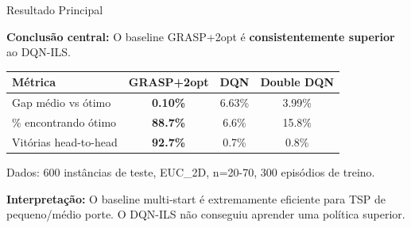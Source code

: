 \documentclass[11pt, xcolor=dvipsnames]{beamer}
\newcommand{\destaque}[1]{\textbf{\textcolor{verde}{#1}}}
\newcommand{\sutil}[1]{\textcolor{textoBase!60}{#1}}
\begin{document}
\begin{frame}{Resultado Principal}
  \footnotesize
  \vspace{-2mm}
  \begin{alertbox}
    {\footnotesize
    \textbf{Conclusão central:} O baseline GRASP+2opt é \destaque{consistentemente superior} ao DQN-ILS.
    }
  \end{alertbox}
  \vspace{2mm}

  \centering
  \renewcommand{\arraystretch}{1.3}
  \begin{tabular}{lccc}
    \toprule
    \textbf{Métrica} & \textbf{GRASP+2opt} & \textbf{DQN} & \textbf{Double DQN} \\
    \midrule
    Gap médio vs ótimo & \destaque{0.10\%} & 6.63\% & 3.99\% \\
    \% encontrando ótimo & \destaque{88.7\%} & 6.6\% & 15.8\% \\
    Vitórias head-to-head & \destaque{92.7\%} & 0.7\% & 0.8\% \\
    \bottomrule
  \end{tabular}

  \vspace{3mm}
  {\scriptsize \sutil{Dados: 600 instâncias de teste, EUC\_2D, n=20-70, 300 episódios de treino.}}

  \vspace{2mm}
  \begin{calloutbox}
    {\scriptsize
    \textbf{Interpretação:} O baseline multi-start é extremamente eficiente para TSP de pequeno/médio porte.
    O DQN-ILS não conseguiu aprender uma política superior.
    }
  \end{calloutbox}
\end{frame}
\end{document}
